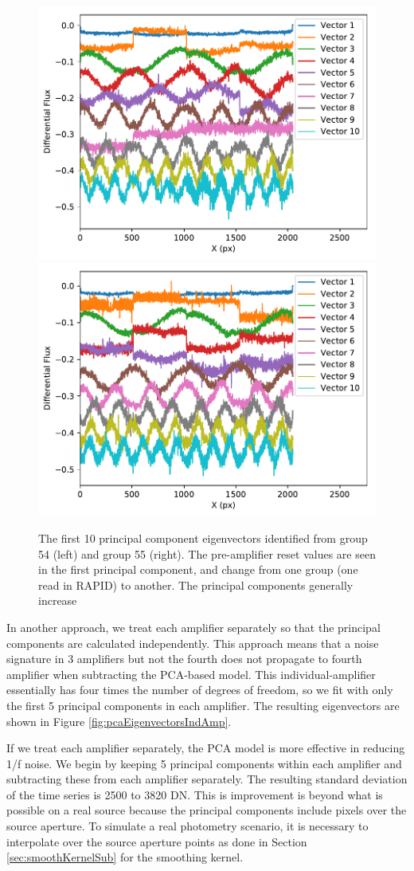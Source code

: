 \documentclass{aastex62}
\begin{document}
\begin{figure}[!hbtp]
\centering
\includegraphics[width=.4\columnwidth]{pca_dark_amp_all_extra_bias_sub_grp_54.pdf}
\includegraphics[width=.4\columnwidth]{pca_dark_amp_all_extra_bias_sub_grp_55.pdf}
\caption{The first 10 principal component eigenvectors identified from group 54 (left) and group 55 (right).
The pre-amplifier reset values are seen in the first principal component, and change from one group (one read in RAPID) to another.
The principal components generally increase 
}\label{fig:pcaEigenvectors}
\end{figure}

In another approach, we treat each amplifier separately so that the principal components are calculated independently.
This approach means that a noise signature in 3 amplifiers but not the fourth does not propagate to fourth amplifier when subtracting the PCA-based model.
This individual-amplifier essentially has four times the number of degrees of freedom, so we fit with only the first 5 principal components in each amplifier.
The resulting eigenvectors are shown in Figure \ref{fig:pcaEigenvectorsIndAmp}.

If we treat each amplifier separately, the PCA model is more effective in reducing 1/f noise.
We begin by keeping 5 principal components within each amplifier and subtracting these from each amplifier separately.
The resulting standard deviation of the time series is 2500 to 3820 DN.
This is improvement is beyond what is possible on a real source because the principal components include pixels over the source aperture.
To simulate a real photometry scenario, it is necessary to interpolate over the source aperture points as done in Section \ref{sec:smoothKernelSub} for the smoothing kernel.
\end{document}
